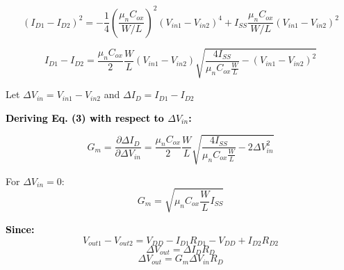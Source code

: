 \noindent
\begin{equation}
(I_{D1} - I_{D2})^2 = -\frac{1}{4} \left( \frac{\mu_n C_{ox}}{W/L} \right)^2 (V_{in1} - V_{in2})^4 
+ I_{SS} \frac{\mu_n C_{ox}}{W/L} (V_{in1} - V_{in2})^2
\end{equation}

\vspace{0.25cm}

\begin{tcolorbox}[colback=white,colframe=black,title=]
\begin{equation}
I_{D1} - I_{D2} = \frac{\mu_n C_{ox}}{2} \frac{W}{L}(V_{in1} - V_{in2}) 
\sqrt{\frac{4 I_{SS}}{\mu_n C_{ox} \frac{W}{L}} - (V_{in1} - V_{in2})^2}
\end{equation}
\end{tcolorbox}

\vspace{0.25cm}

\noindent
\begin{center}
Let \quad $\Delta V_{in} = V_{in1} - V_{in2}$ \quad and \quad $\Delta I_D = I_{D1} - I_{D2}$
\end{center}

\vspace{0.25cm}

\noindent

\textbf{\textcolor{black}{Deriving Eq. (3) with respect to $\Delta V_{in}$:}}
\begin{tcolorbox}[colback=white,colframe=black,title=]
\begin{equation}
G_m = \frac{\partial \Delta I_D}{\partial \Delta V_{in}} 
= \frac{\mu_n C_{ox}}{2} \frac{W}{L} 
\sqrt{\frac{4 I_{SS}}{\mu_n C_{ox} \frac{W}{L}} - 2 \Delta V_{in}^2}
\end{equation}
\end{tcolorbox}

\vspace{0.75cm}

\noindent
For \quad $\Delta V_{in} = 0 :$ \quad 
\[
G_m = \sqrt{\mu_n C_{ox} \frac{W}{L} I_{SS}}
\]

\vspace{0.55cm}

\noindent
\textbf{\textcolor{black}{Since:}}
\[
V_{out1} - V_{out2} = V_{DD} - I_{D1} R_{D1} - V_{DD} + I_{D2} R_{D2}
\]
\[
\Delta V_{out} = \Delta I_D R_D
\]
\[
\Delta V_{out} = G_m \Delta V_{in} R_D
\]

\vspace{0.5cm}

